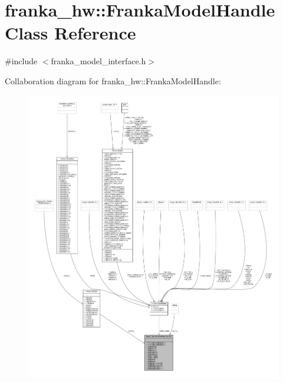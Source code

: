 \hypertarget{classfranka__hw_1_1FrankaModelHandle}{}\section{franka\+\_\+hw\+:\+:Franka\+Model\+Handle Class Reference}
\label{classfranka__hw_1_1FrankaModelHandle}


{\ttfamily \#include $<$franka\+\_\+model\+\_\+interface.\+h$>$}



Collaboration diagram for franka\+\_\+hw\+:\+:Franka\+Model\+Handle\+:
\nopagebreak
\begin{figure}[H]
\begin{center}
\leavevmode
\includegraphics[width=350pt]{classfranka__hw_1_1FrankaModelHandle__coll__graph}
\end{center}
\end{figure}
